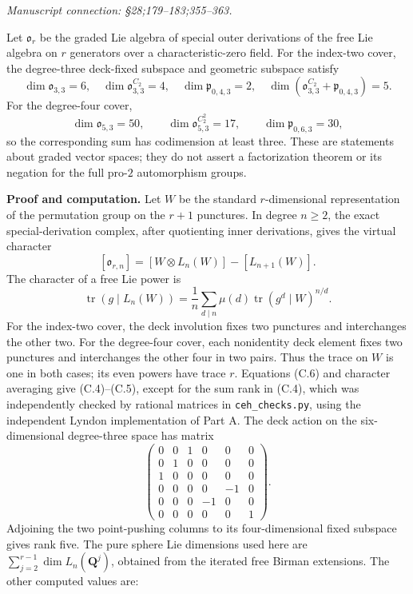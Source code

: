 \documentclass[10pt,a4paper]{article}
\begin{document}
\emph{Manuscript connection: \S{}28;179--183;355--363.}

\nopagebreak[4]

Let \(\mathfrak o_r\) be the graded Lie algebra of special outer derivations of the free Lie algebra on \(r\) generators over a characteristic-zero field. For the index-two cover, the degree-three deck-fixed subspace and geometric subspace satisfy \[
 \dim\mathfrak o_{3,3}=6,\quad
 \dim\mathfrak o_{3,3}^{C_2}=4,\quad
 \dim\mathfrak p_{0,4,3}=2,\quad
 \dim(\mathfrak o_{3,3}^{C_2}+\mathfrak p_{0,4,3})=5.
                                                               \tag{C.4}
\] For the degree-four cover, \[
 \dim\mathfrak o_{5,3}=50,\qquad
 \dim\mathfrak o_{5,3}^{C_2^2}=17,\qquad
 \dim\mathfrak p_{0,6,3}=30,
                                                               \tag{C.5}
\] so the corresponding sum has codimension at least three. These are statements about graded vector spaces; they do not assert a factorization theorem or its negation for the full pro-\(2\) automorphism groups.

\textbf{Proof and computation.} Let \(W\) be the standard \(r\)-dimensional representation of the permutation group on the \(r+1\) punctures. In degree \(n\geq2\), the exact special-derivation complex, after quotienting inner derivations, gives the virtual character \[
 [\mathfrak o_{r,n}]=[W\otimes L_n(W)]-[L_{n+1}(W)].   \tag{C.6}
\] The character of a free Lie power is \[
 \operatorname{tr}(g\mid L_n(W))=
 \frac1n\sum_{d\mid n}\mu(d)\operatorname{tr}(g^d\mid W)^{n/d}.
\] For the index-two cover, the deck involution fixes two punctures and interchanges the other two. For the degree-four cover, each nonidentity deck element fixes two punctures and interchanges the other four in two pairs. Thus the trace on \(W\) is one in both cases; its even powers have trace \(r\). Equations (C.6) and character averaging give (C.4)--(C.5), except for the sum rank in (C.4), which was independently checked by rational matrices in \texttt{ceh\_checks.py}, using the independent Lyndon implementation of Part A. The deck action on the six-dimensional degree-three space has matrix \[
 \begin{pmatrix}
0&0&1&0&0&0\\0&1&0&0&0&0\\1&0&0&0&0&0\\
0&0&0&0&-1&0\\0&0&0&-1&0&0\\0&0&0&0&0&1
\end{pmatrix}.
\] Adjoining the two point-pushing columns to its four-dimensional fixed subspace gives rank five. The pure sphere Lie dimensions used here are \(\sum_{j=2}^{r-1}\dim L_n(\mathbf Q^j)\), obtained from the iterated free Birman extensions. The other computed values are:
\end{document}

